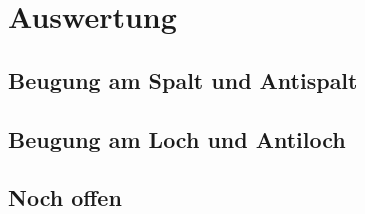 \section{Auswertung}


\subsection{Beugung am Spalt und Antispalt}

\subsection{Beugung am Loch und Antiloch}

\subsection{Noch offen}
